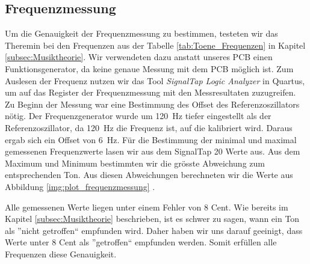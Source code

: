 \subsection{Frequenzmessung}\label{subsec:Frequenzmessung}
Um die Genauigkeit der Frequenzmessung zu bestimmen, testeten wir das Theremin bei den  Frequenzen aus der Tabelle \ref{tab:Toene_Frequenzen} in Kapitel \ref{subsec:Musiktheorie}.
 Wir verwendeten dazu anstatt unseres PCB einen Funktionsgenerator, da keine genaue Messung mit dem PCB möglich ist. Zum Auslesen der Frequenz nutzen wir das Tool \textit{SignalTap Logic Analyzer} in Quartus, um auf das Register der Frequenzmessung mit den Messresultaten zuzugreifen.
 Zu Beginn der Messung war eine Bestimmung des Offset des Referenzoszillators nötig. Der Frequenzgenerator wurde um \SI{120}{Hz} tiefer eingestellt als der Referenzoszillator, da \SI{120}{Hz} die Frequenz ist, auf die kalibriert wird. Daraus ergab sich ein Offset von  \SI{6}{Hz}.
 Für die Bestimmung der minimal und maximal gemessenen Frequenzwerte lasen wir aus dem SignalTap 20 Werte aus. Aus dem Maximum und Minimum bestimmten wir die grösste Abweichung zum entsprechenden Ton. Aus diesen Abweichungen berechneten wir die Werte aus Abbildung \ref{img:plot_frequenzmessung} .

 Alle gemessenen Werte liegen unter einem Fehler von 8 Cent. Wie bereits im Kapitel \ref{subsec:Musiktheorie} beschrieben, ist es schwer zu sagen, wann ein Ton als ''nicht getroffen`` empfunden wird. Daher haben wir uns darauf geeinigt, dass Werte unter 8 Cent als ''getroffen`` empfunden werden. Somit erfüllen alle Frequenzen diese Genauigkeit.
 
